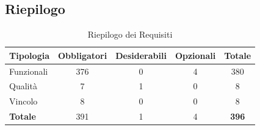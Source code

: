 \subsection{Riepilogo}
\begin{table}[H]
    \centering
    \begin{tabular}{|l|c|c|c|c|}
        \hline
        \rowcolor{zpusgreen!30}
        \textbf{Tipologia} & \textbf{Obbligatori} & \textbf{Desiderabili} & \textbf{Opzionali} & \textbf{Totale} \\
        \hline
        Funzionali & 376 & 0 & 4 & 380 \\
        \hline
        Qualità & 7 & 1 & 0 & 8 \\
        \hline
        Vincolo & 8 & 0 & 0 & 8 \\
        \hline
        \textbf{Totale} & 391 & 1 & 4 & \textbf{396} \\
        \hline
    \end{tabular}
    \caption{Riepilogo dei Requisiti}
    \label{tab:riepilogo-requisiti}
\end{table}